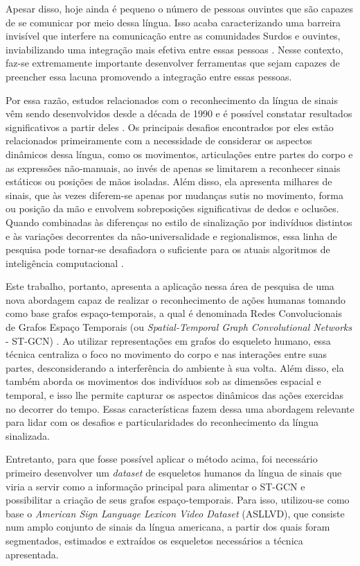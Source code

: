 Apesar disso, hoje ainda é pequeno o número de pessoas ouvintes que são capazes de se comunicar por meio dessa língua. Isso acaba caracterizando uma barreira invisível que interfere na comunicação entre as comunidades Surdos e ouvintes, inviabilizando uma integração mais efetiva entre essas pessoas \cite{peres-2006}. Nesse contexto, faz-se extremamente importante desenvolver ferramentas que sejam capazes de preencher essa lacuna promovendo a integração entre essas pessoas. 

Por essa razão, estudos relacionados com o reconhecimento da língua de sinais vêm sendo desenvolvidos desde a década de 1990 e é possível constatar resultados significativos a partir deles \cite{lim-2016, recent-advances-dl-2017}. Os principais desafios encontrados por eles estão relacionados primeiramente com a necessidade de considerar os aspectos dinâmicos dessa língua, como os movimentos, articulações entre partes do corpo e as expressões não-manuais, ao invés de apenas se limitarem a reconhecer sinais estáticos ou posições de mãos isoladas. Além disso, ela apresenta milhares de sinais, que às vezes diferem-se apenas por mudanças sutis no movimento, forma ou posição da mão e envolvem sobreposições significativas de dedos e oclusões. Quando combinadas às diferenças no estilo de sinalização por indivíduos distintos e às variações decorrentes da não-universalidade e regionalismos, essa linha de pesquisa pode tornar-se desafiadora o suficiente para os atuais algoritmos de inteligência computacional \cite{konstantinidis-2018}.

Este trabalho, portanto, apresenta a aplicação nessa área de pesquisa de uma nova abordagem capaz de realizar o reconhecimento de ações humanas tomando como base grafos espaço-temporais, a qual é denominada Redes Convolucionais de Grafos Espaço Temporais (ou \textit{Spatial-Temporal Graph Convolutional Networks} - ST-GCN) \cite{st-gcn-2018}.
Ao utilizar representações em grafos do esqueleto humano, essa técnica centraliza o foco no movimento do corpo e nas interações entre suas partes, desconsiderando a interferência do ambiente à sua volta. Além disso, ela também aborda os movimentos dos indivíduos sob as dimensões espacial e temporal, e isso lhe permite capturar os aspectos dinâmicos das ações exercidas no decorrer do tempo. Essas características fazem dessa uma abordagem relevante para lidar com os desafios e particularidades do reconhecimento da língua sinalizada.

Entretanto, para que fosse possível aplicar o método acima, foi necessário primeiro desenvolver um \textit{dataset} de esqueletos humanos da língua de sinais que viria a servir como a informação principal para alimentar o ST-GCN e possibilitar a criação de seus grafos espaço-temporais. Para isso, utilizou-se como base o \textit{American Sign Language Lexicon Video Dataset} (ASLLVD), que consiste num amplo conjunto de sinais da língua americana, a partir dos quais foram segmentados, estimados e extraídos os esqueletos necessários a técnica apresentada.

